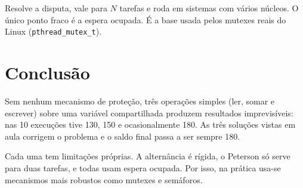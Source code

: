 \documentclass[11pt,a4paper]{article}
\begin{document}
Resolve a disputa, vale para $N$ tarefas e roda em sistemas com vários
núcleos. O único ponto fraco é a espera ocupada. É a base usada pelos
mutexes reais do Linux (\texttt{pthread\_mutex\_t}).

\section*{Conclusão}

Sem nenhum mecanismo de proteção, três operações simples (ler, somar e
escrever) sobre uma variável compartilhada produzem resultados
imprevisíveis: nas 10 execuções tive 130, 150 e ocasionalmente 180.
As três soluções vistas em aula corrigem o problema e o saldo final
passa a ser sempre 180.

Cada uma tem limitações próprias. A alternância é rígida, o Peterson só
serve para duas tarefas, e todas usam espera ocupada. Por isso, na
prática usa-se mecanismos mais robustos como mutexes e semáforos.
\end{document}
